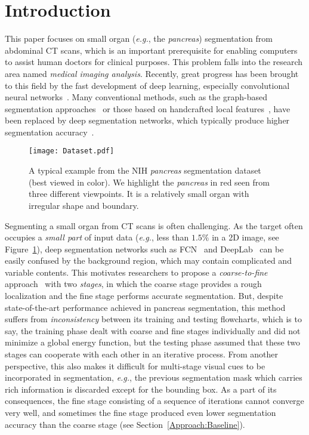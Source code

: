\documentclass[10pt,twocolumn,letterpaper]{article}
\begin{document}
\section{Introduction}
\label{Introduction}

This paper focuses on small organ ({\em e.g.}, the {\em pancreas}) segmentation from abdominal CT scans,
which is an important prerequisite for enabling computers to assist human doctors for clinical purposes.
This problem falls into the research area named {\em medical imaging analysis}.
Recently, great progress has been brought to this field by the fast development of deep learning,
especially convolutional neural networks~\cite{Krizhevsky_2012_ImageNet}\cite{Long_2015_Fully}.
Many conventional methods, such as the graph-based segmentation approaches~\cite{Ali_2007_Graph}
or those based on handcrafted local features~\cite{Wang_2014_Geodesic},
have been replaced by deep segmentation networks,
which typically produce higher segmentation accuracy~\cite{Ronneberger_2015_UNet}\cite{Roth_2015_DeepOrgan}.

\newcommand{\figurewidth}{7.0cm}
\begin{figure}[t]
\begin{center}
    \texttt{[image: Dataset.pdf]}
\end{center}
\caption{
    A typical example from the NIH {\em pancreas} segmentation dataset~\cite{Roth_2015_DeepOrgan} (best viewed in color).
    We highlight the {\em pancreas} in red seen from three different viewpoints.
    It is a relatively small organ with irregular shape and boundary.
}
\label{Fig:Dataset}
\end{figure}

Segmenting a small organ from CT scans is often challenging.
As the target often occupies a {\em small part} of input data
({\em e.g.}, less than $1.5\%$ in a 2D image, see Figure~\ref{Fig:Dataset}),
deep segmentation networks such as FCN~\cite{Long_2015_Fully} and DeepLab~\cite{Chen_2015_Semantic}
can be easily confused by the background region, which may contain complicated and variable contents.
This motivates researchers to propose a {\em coarse-to-fine} approach~\cite{Zhou_2017_Fixed} with two {\em stages},
in which the coarse stage provides a rough localization and the fine stage performs accurate segmentation.
But, despite state-of-the-art performance achieved in pancreas segmentation,
this method suffers from {\em inconsistency} between its training and testing flowcharts,
which is to say, the training phase dealt with coarse and fine stages individually and did not minimize a global energy function,
but the testing phase assumed that these two stages can cooperate with each other in an iterative process.
From another perspective, this also makes it difficult for multi-stage visual cues to be incorporated in segmentation,
{\em e.g.}, the previous segmentation mask which carries rich information is discarded except for the bounding box.
As a part of its consequences, the fine stage consisting of a sequence of iterations cannot converge very well,
and sometimes the fine stage produced even lower segmentation accuracy than the coarse stage (see Section~\ref{Approach:Baseline}).
\end{document}
